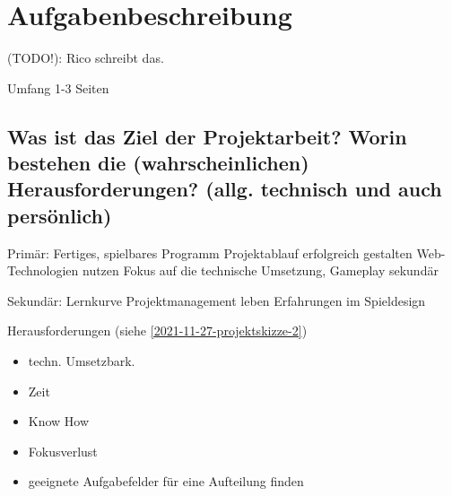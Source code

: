 

\section{Aufgabenbeschreibung}

(TODO!): Rico schreibt das.

Umfang 1-3 Seiten


\subsection{Was ist das Ziel der Projektarbeit? Worin bestehen die (wahrscheinlichen) Herausforderungen? (allg. technisch und auch persönlich)}

Primär: 
Fertiges, spielbares Programm 
Projektablauf erfolgreich gestalten 
Web-Technologien nutzen
Fokus auf die technische Umsetzung, Gameplay sekundär

Sekundär: 
Lernkurve
Projektmanagement leben
Erfahrungen im Spieldesign 

Herausforderungen (siehe \ref{2021-11-27-projektskizze-2})

\begin{itemize}
    \item techn. Umsetzbark.
    \item Zeit
    \item Know How
    \item Fokusverlust
    \item geeignete Aufgabefelder für eine Aufteilung finden 
\end{itemize}

